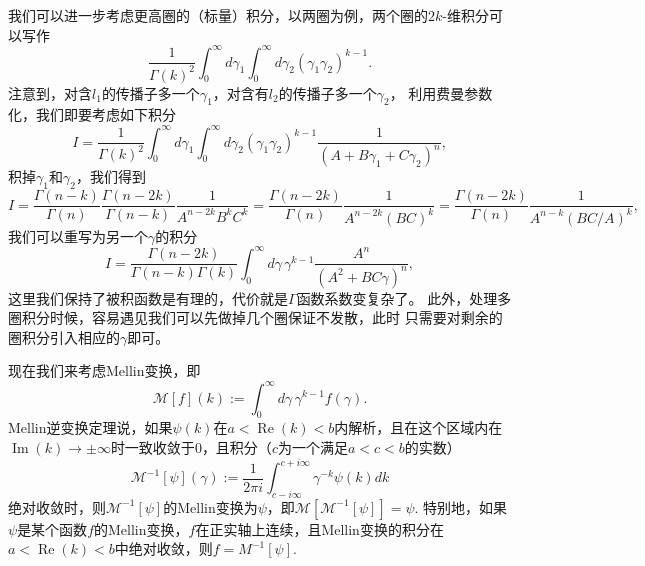 \documentclass[12pt]{article}
\theoremstyle{definition}
\theoremstyle{plain}
\begin{document}
我们可以进一步考虑更高圈的（标量）积分，以两圈为例，两个圈的$2k$-维积分可以写作
\[
	\frac{1}{\Gamma(k)^2}\int_0^\infty d\gamma_1
	\int_0^\infty d\gamma_2 (\gamma_1\gamma_2)^{k-1}.
\]
注意到，对含$l_1$的传播子多一个$\gamma_1$，对含有$l_2$的传播子多一个$\gamma_2$，
利用费曼参数化，我们即要考虑如下积分
\[
	I=\frac{1}{\Gamma(k)^2}\int_0^\infty d\gamma_1
	\int_0^\infty d\gamma_2 (\gamma_1\gamma_2)^{k-1}
	\frac{1}{(A+B\gamma_1+C\gamma_2)^n},
\]
积掉$\gamma_1$和$\gamma_2$，我们得到
\[
	I=\frac{\Gamma(n-k)}{\Gamma(n)}\frac{\Gamma(n-2k)}{\Gamma(n-k)}
	\frac{1}{A^{n-2k}B^kC^k}=\frac{\Gamma(n-2k)}{\Gamma(n)}
	\frac{1}{A^{n-2k}(BC)^k}=\frac{\Gamma(n-2k)}{\Gamma(n)}
	\frac{1}{A^{n-k}(BC/A)^{k}},
\]
我们可以重写为另一个$\gamma$的积分
\[
	I=\frac{\Gamma(n-2k)}{\Gamma(n-k)\Gamma(k)}\int_0^\infty d\gamma\,\gamma^{k-1}
	\frac{A^n}{(A^2+BC\gamma)^n},
\]
这里我们保持了被积函数是有理的，代价就是$\Gamma$函数系数变复杂了。
此外，处理多圈积分时候，容易遇见我们可以先做掉几个圈保证不发散，此时
只需要对剩余的圈积分引入相应的$\gamma$即可。

现在我们来考虑Mellin变换，即
\[
	\mathcal M[f](k):=\int_0^\infty d\gamma\, \gamma^{k-1} f(\gamma).
\]
Mellin逆变换定理说，如果$\psi(k)$在$a<\operatorname{Re}(k)<b$内解析，且在这个区域内在$\operatorname{Im}(k)\to \pm \infty$时一致收敛于$0$，且积分（$c$为一个满足$a<c<b$的实数）
\[
	\mathcal M^{-1}[\psi](\gamma):=\frac{1}{2\pi i}\int_{c-i\infty}^{c+i\infty}\gamma^{-k}\psi(k)dk
\]
绝对收敛时，则$\mathcal M^{-1}[\psi]$的Mellin变换为$\psi$，即$\mathcal M[\mathcal M^{-1}[\psi]]=\psi$. 特别地，如果$\psi$是某个函数$f$的Mellin变换，$f$在正实轴上连续，且Mellin变换的积分在$a<\operatorname{Re}(k)<b$中绝对收敛，则$f=M^{-1}[\psi]$.
\end{document}
